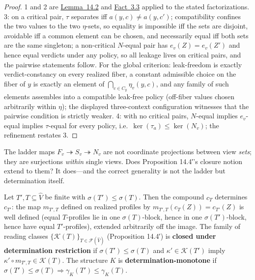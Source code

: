 \begin{proof}

1 and 2 are \hyperlink{stmt:14.2}{Lemma~14.2} and \hyperlink{stmt:3.3}{Fact~3.3} applied to the stated factorizations. 3: on a critical pair, \(\tau\) separates iff \(a(y,c) \ne a(y,c')\); compatibility confines the two values to the two \(\eta\)-sets, so equality is impossible iff the sets are disjoint, avoidable iff a common element can be chosen, and necessarily equal iff both sets are the same singleton; a non-critical \(N\)-equal pair has \(e_v(Z) = e_v(Z')\) and hence equal verdicts under any policy, so all leakage lives on critical pairs, and the pairwise statements follow. For the global criterion: leak-freedom is exactly verdict-constancy on every realized fiber, a constant admissible choice on the fiber of \(y\) is exactly an element of \(\bigcap_{c \in C_y} \eta_v(y,c)\), and any family of such elements assembles into a compatible leak-free policy (off-fiber values chosen arbitrarily within \(\eta\)); the displayed three-context configuration witnesses that the pairwise condition is strictly weaker. 4: with no critical pairs, \(N\)-equal implies \(e_v\)-equal implies \(\tau\)-equal for every policy, i.e.~\(\ker(\tau_a) \le \ker(N_v)\); the refinement restates 3.
\end{proof}


The ladder maps \(F_v \twoheadrightarrow S_v \twoheadrightarrow N_v\) are not coordinate projections between view \emph{sets}; they are surjections \emph{within} single views. Does Proposition 14.4′'s closure notion extend to them? It does---\hspace{0pt}and the correct generality is not the ladder but determination itself.

\begin{thmdef}

Let \(T', T \subseteq \widehat{V}\) be finite with \(\sigma(T') \le \sigma(T)\). Then the compound \(c_T\) determines \(c_{T'}\): the map \(m_{T',T}\) defined on realized profiles by \(m_{T',T}(c_T(Z)) = c_{T'}(Z)\) is well defined (equal \(T\)-profiles lie in one \(\sigma(T)\)-block, hence in one \(\sigma(T')\)-block, hence have equal \(T'\)-profiles), extended arbitrarily off the image. The family of reading classes \(\{\mathcal{K}(T)\}_{T \in \mathcal{F}(\widehat V)}\) (Proposition 14.4′) is \textbf{closed under determination restriction} if \(\sigma(T') \le \sigma(T)\) and \(\kappa' \in \mathcal{K}(T')\) imply \(\kappa' \circ m_{T',T} \in \mathcal{K}(T)\). The structure \(K\) is \textbf{determination-monotone} if \(\sigma(T') \le \sigma(T) \Rightarrow \gamma_K(T') \le \gamma_K(T)\).
\end{thmdef}

